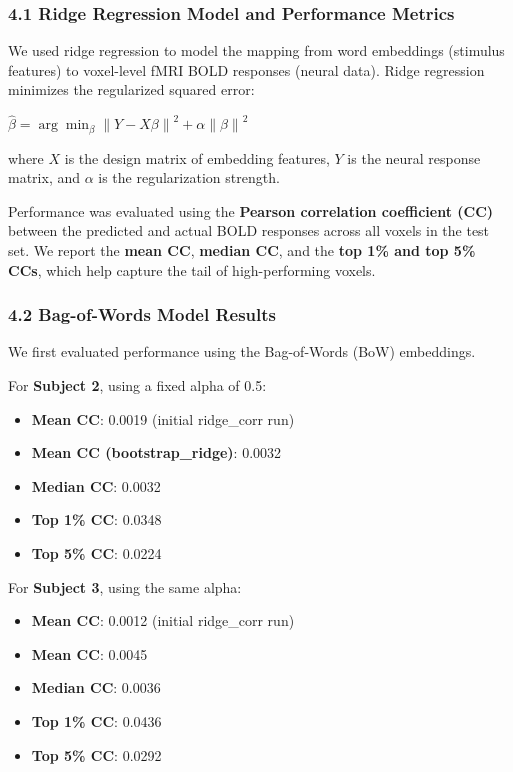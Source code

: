\documentclass[11pt]{article}
\begin{document}
\hypertarget{ridge-regression-model-and-performance-metrics}{%
\subsubsection{4.1 Ridge Regression Model and Performance
Metrics}\label{ridge-regression-model-and-performance-metrics}}

We used ridge regression to model the mapping from word embeddings
(stimulus features) to voxel-level fMRI BOLD responses (neural data).
Ridge regression minimizes the regularized squared error:

\(\hat{\beta} = \arg\min_\beta \left\| Y - X\beta \right\|^2 + \alpha \left\| \beta \right\|^2\)

where \(X\) is the design matrix of embedding features, \(Y\) is the
neural response matrix, and \(\alpha\) is the regularization strength.

Performance was evaluated using the \textbf{Pearson correlation
coefficient (CC)} between the predicted and actual BOLD responses across
all voxels in the test set. We report the \textbf{mean CC},
\textbf{median CC}, and the \textbf{top 1\% and top 5\% CCs}, which help
capture the tail of high-performing voxels.

\hypertarget{bag-of-words-model-results}{%
\subsubsection{4.2 Bag-of-Words Model
Results}\label{bag-of-words-model-results}}

We first evaluated performance using the Bag-of-Words (BoW) embeddings.

For \textbf{Subject 2}, using a fixed alpha of 0.5:

\begin{itemize}
\item
  \textbf{Mean CC}: 0.0019 (initial ridge\_corr run)
\item
  \textbf{Mean CC (bootstrap\_ridge)}: 0.0032
\item
  \textbf{Median CC}: 0.0032
\item
  \textbf{Top 1\% CC}: 0.0348
\item
  \textbf{Top 5\% CC}: 0.0224
\end{itemize}

For \textbf{Subject 3}, using the same alpha:

\begin{itemize}
\item
  \textbf{Mean CC}: 0.0012 (initial ridge\_corr run)
\item
  \textbf{Mean CC}: 0.0045
\item
  \textbf{Median CC}: 0.0036
\item
  \textbf{Top 1\% CC}: 0.0436
\item
  \textbf{Top 5\% CC}: 0.0292
\end{itemize}
\end{document}
